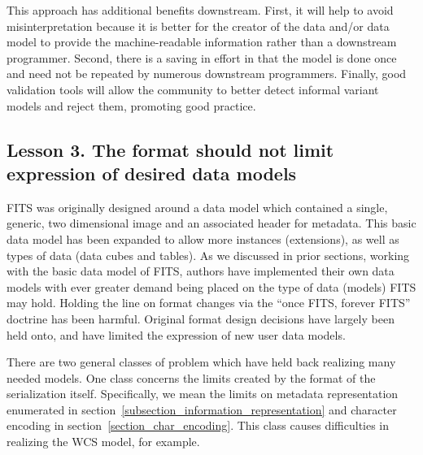 \documentclass[final,authoryear,5p,times,twocolumn]{elsarticle}
\begin{document}
{{This approach has additional benefits downstream. First, it will help
to avoid misinterpretation because it is better for the creator
of the data and/or data model to provide the machine-readable information rather
than a downstream programmer. Second, there is a saving in effort
in that the model is done once and need not be repeated by numerous
downstream programmers. Finally, good validation tools will allow the community
to better detect informal variant models and reject them, promoting good
practice.


\subsection{Lesson 3. The format should not limit expression of desired data models}

FITS was originally designed around a data model which contained a single, generic,
two dimensional image and an associated header for metadata. This basic data model
has been expanded to allow more instances (extensions), as well as types of data
(data cubes and tables).
As we discussed in prior sections, working with the basic data model of FITS,
authors have implemented their own data models with ever greater demand being
placed on the type of data (models) FITS may hold.
Holding the line on format changes via the ``once FITS, forever FITS'' doctrine
has been harmful.  Original format design decisions have largely been held onto,
and have limited the expression of new user data models.


There are two general classes of problem which have held back realizing
many needed models. One class concerns the limits created by the format
of the serialization itself. Specifically, we mean the limits on metadata
representation enumerated in section~\ref{subsection_information_representation}
and character encoding in section~\ref{section_char_encoding}.
This class causes difficulties in realizing the WCS model, for example.


}}
\end{document}
